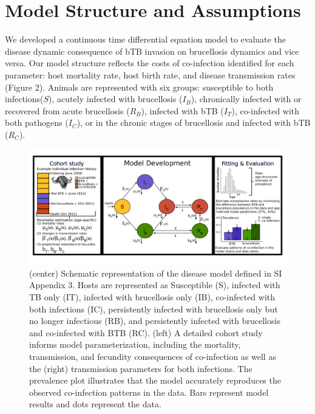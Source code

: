 \documentclass[letterpaper,12pt]{article}
\begin{document}
\pagebreak


\section*{Model Structure and Assumptions}

We developed a continuous time differential equation model to evaluate the disease dynamic consequence of bTB invasion on brucellosis dynamics and vice versa.  
Our model structure reflects the costs of co-infection identified for each parameter: host mortality rate, host birth rate, and disease transmission rates (Figure 2).
Animals are represented with six groups: susceptible to both infections($S$), acutely infected with brucellosis ($I_{B}$), chronically infected with or recovered from acute brucellosis ($R_{B}$), infected with bTB ($I_{T}$), co-infected with both pathogens ($I_{C}$), or in the chronic stages of brucellosis and infected with bTB ($R_{C}$). 

\begin{figure}
\begin{center}
\includegraphics[width=6in]{Figure1_PNAS.jpg}
\end{center}
\caption{(center) Schematic representation of the disease model defined in SI Appendix 3.  Hosts are represented as Susceptible (S), infected with TB only (IT), infected with brucellosis only (IB), co-infected with both infections (IC), persistently infected with brucellosis only but no longer infectious (RB), and persistently infected with brucellosis and co-infected with BTB (RC). (left) A detailed cohort study informs model parameterization, including the mortality, transmission, and fecundity consequences of co-infection as well as the (right) transmission parameters for both infections.  The prevalence plot illustrates that the model accurately reproduces the observed co-infection patterns in the data.  Bars represent model results and dots represent the data.}
\label{fig2}
\end{figure}
\end{document}
